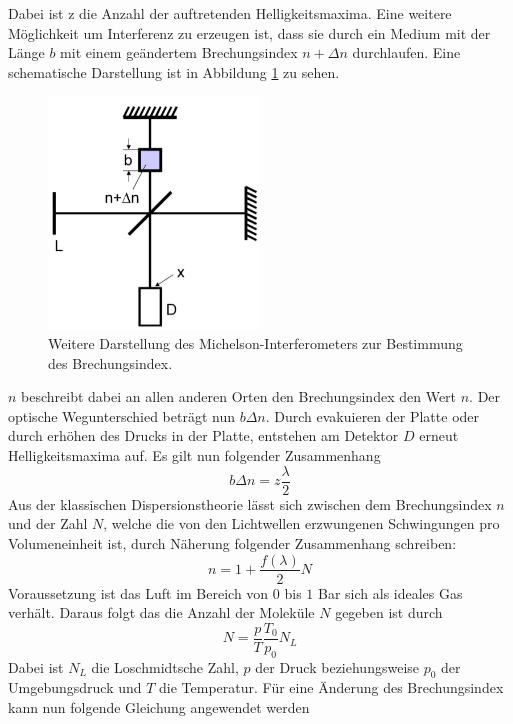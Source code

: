 Dabei ist z die Anzahl der auftretenden Helligkeitsmaxima.
Eine weitere Möglichkeit um Interferenz zu erzeugen ist, dass sie durch ein Medium mit der Länge $b$ mit
einem geändertem Brechungsindex $n+\Delta n$ durchlaufen.
Eine schematische Darstellung ist in Abbildung \ref{abb:2} zu sehen.
\begin{figure}[H]
  \centering
  \includegraphics[width=0.5\textwidth]{content/Aufbau2.png}
  \caption{Weitere Darstellung des Michelson-Interferometers zur Bestimmung des Brechungsindex.\cite{1}}
  \label{abb:2}
\end{figure}
$n$ beschreibt dabei an allen anderen Orten den Brechungsindex den Wert $n$. Der optische
Wegunterschied beträgt nun $b\Delta n$.
Durch evakuieren der Platte oder durch erhöhen des Drucks in der Platte, entstehen am Detektor $D$ erneut
Helligkeitsmaxima auf. Es gilt nun folgender Zusammenhang
\begin{equation}
  b\Delta n = z \frac{\lambda}{2}
  \label{eq:2}
\end{equation}
Aus der klassischen Dispersionstheorie lässt sich zwischen dem Brechungsindex $n$ und
der Zahl $N$, welche die von den Lichtwellen erzwungenen Schwingungen pro Volumeneinheit ist, durch Näherung folgender
Zusammenhang schreiben:
\begin{equation*}
  n = 1+\frac{f(\lambda)}{2}N
\end{equation*}
Voraussetzung ist das Luft im Bereich von $0$ bis $1$ Bar sich als ideales Gas verhält.
Daraus folgt das die Anzahl der Moleküle $N$ gegeben ist durch
\begin{equation*}
  N = \frac{p}{T} \frac{T_0}{p_0} N_L
\end{equation*}
Dabei ist $N_L$ die Loschmidtsche Zahl, $p$ der Druck beziehungsweise $p_0$ der Umgebungsdruck und
$T$ die Temperatur.
Für eine Änderung des Brechungsindex kann nun folgende Gleichung angewendet werden
